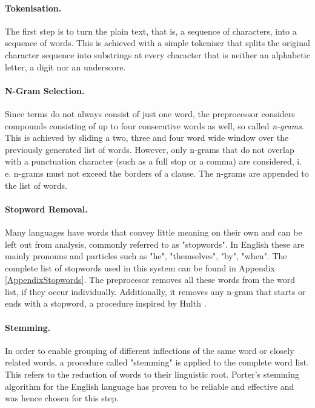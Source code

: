 \documentclass[11pt,a4paper,twoside]{article}
\begin{document}
\paragraph{Tokenisation.} The first step is to turn the plain text, that is, a sequence of characters, into a sequence of words. This is achieved with a simple tokeniser that splits the original character sequence into substrings at every character that is neither an alphabetic letter, a digit nor an underscore. 

\paragraph{N-Gram Selection.} Since terms do not always consist of just one word, the preprocessor considers compounds consisting of up to four consecutive words as well, so called \emph{n-grams}. This is achieved by sliding a two, three and four word wide window over the previously generated list of words. However, only n-grams that do not overlap with a punctuation character (such as a full stop or a comma) are considered, i. e. n-grams must not exceed the borders of a clause. The n-grams are appended to the list of words.

\paragraph{Stopword Removal.} Many languages have words that convey little meaning on their own and can be left out from analysis, commonly referred to as "stopwords". In English these are mainly pronouns and particles such as "he", "themselves", "by", "when". The complete list of stopwords used in this system can be found in Appendix \ref{AppendixStopwords}. The preprocesor removes all these words from the word list, if they occur individually. Additionally, it removes any n-gram that starts or ends with a stopword, a procedure inspired by Hulth \cite{HulthImprovedKnowledge}.

\paragraph{Stemming.} In order to enable grouping of different inflections of the same word or closely related words, a procedure called "stemming" is applied to the complete word list. This refers to the reduction of words to their linguistic root. Porter's stemming algorithm \cite{Porter1980AnStripping} for the English language has proven to be reliable and effective and was hence chosen for this step.
\end{document}
